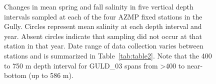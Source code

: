 \documentclass[12pt]{article}\usepackage[]{graphicx}\usepackage[]{color}
\begin{document}
\begin{figure}[htb]

{\centering {} 

}

\caption{Changes in mean spring and fall salinity in five vertical depth intervals sampled at each of the four AZMP fixed stations in the Gully. Circles represent mean salinity at each depth interval and year. Absent circles indicate that sampling did not occur at that station in that year. Date range of data collection varies between stations and is summarized in Table~\ref{tab:table2}. Note that the 400 to 750 m depth interval for GULD\_03 spans from \textgreater400 to near-bottom (up to 586 m).}\label{fig:figure11}
\end{figure}
\clearpage
\end{document}
